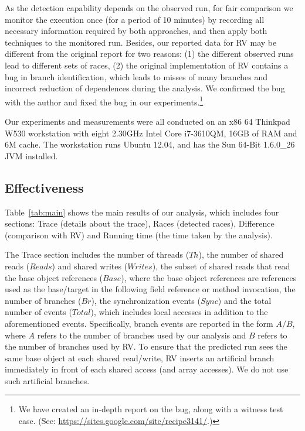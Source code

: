 As the detection capability  depends on the observed run, for fair 
comparison we monitor the execution once (for a period of 10 minutes) by recording all necessary 
information required by both approaches, and then apply both techniques 
to the monitored run. Besides, our reported data for RV may be different 
from the original report for two reasons: (1) the different observed runs 
lead to different sets of races, (2) the original implementation of RV 
contains a bug in branch identification, which leads to  misses of 
many branches and  incorrect reduction of dependences during the analysis. 
We confirmed the bug with the author and fixed the bug in our 
experiments.\footnote{We have created an in-depth report on the bug, 
along with a witness test case. (See:  \url{https://sites.google.com/site/recipe3141/}.)}


Our experiments and measurements were all conducted on an x86 64 
Thinkpad W530 workstation with eight 2.30GHz Intel Core i7-3610QM, 
16GB of RAM and 6M cache. The workstation runs Ubuntu 12.04,
and has the Sun 64-Bit 1.6.0\_26 JVM installed.










\subsection{Effectiveness}
Table~\ref{tab:main} shows the main results of our analysis, which includes four sections: Trace (details about the trace), Races (detected races), Difference (comparison with RV) and Running time (the time taken by the analysis).


The Trace section includes the number of threads ($Th$), the number of 
shared reads ($Reads$) and shared writes ($Writes$), the subset of shared 
reads that read the base object references  ($Base$), where the  base object 
references are references used as the base/target in the following field 
reference or method invocation,  the number of branches ($Br$), the 
synchronization events ($Sync$) and the total number of events ($Total$), 
which includes local accesses in addition to the aforementioned events. 
Specifically, branch events are reported in the form $A/B$, where $A$ refers 
to the number of branches used by our analysis and $B$ refers to the number 
of branches used by RV. To ensure that the predicted run sees the same 
base object at each shared read/write, {\sf RV} inserts an artificial 
branch immediately in front of each shared access (and array accesses). 
We do not use such artificial branches.



